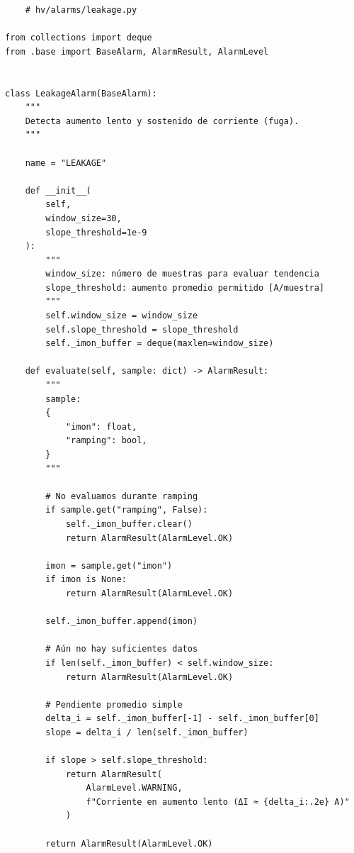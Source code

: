 \documentclass{article}
\begin{document}
\begin{lstlisting}
    # hv/alarms/leakage.py

from collections import deque
from .base import BaseAlarm, AlarmResult, AlarmLevel


class LeakageAlarm(BaseAlarm):
    """
    Detecta aumento lento y sostenido de corriente (fuga).
    """

    name = "LEAKAGE"

    def __init__(
        self,
        window_size=30,
        slope_threshold=1e-9
    ):
        """
        window_size: número de muestras para evaluar tendencia
        slope_threshold: aumento promedio permitido [A/muestra]
        """
        self.window_size = window_size
        self.slope_threshold = slope_threshold
        self._imon_buffer = deque(maxlen=window_size)

    def evaluate(self, sample: dict) -> AlarmResult:
        """
        sample:
        {
            "imon": float,
            "ramping": bool,
        }
        """

        # No evaluamos durante ramping
        if sample.get("ramping", False):
            self._imon_buffer.clear()
            return AlarmResult(AlarmLevel.OK)

        imon = sample.get("imon")
        if imon is None:
            return AlarmResult(AlarmLevel.OK)

        self._imon_buffer.append(imon)

        # Aún no hay suficientes datos
        if len(self._imon_buffer) < self.window_size:
            return AlarmResult(AlarmLevel.OK)

        # Pendiente promedio simple
        delta_i = self._imon_buffer[-1] - self._imon_buffer[0]
        slope = delta_i / len(self._imon_buffer)

        if slope > self.slope_threshold:
            return AlarmResult(
                AlarmLevel.WARNING,
                f"Corriente en aumento lento (ΔI ≈ {delta_i:.2e} A)"
            )

        return AlarmResult(AlarmLevel.OK)

\end{lstlisting}
\end{document}
